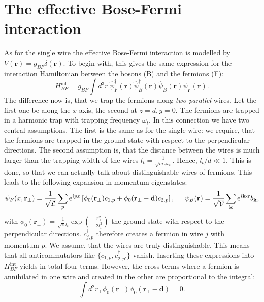 \section{The effective Bose-Fermi interaction} 
As for the single wire the effective Bose-Fermi interaction is modelled by $V(\mathbf{r}) = g_{BF}\delta(\mathbf{r})$. To begin with, this gives the same expression for the interaction Hamiltonian between the bosons (B) and the fermions (F):
\begin{equation}
H_{BF}^\text{int} = g_{BF}\int d^3 r \; \hat{\psi}_F^\dagger(\mathbf{r}) \hat{\psi}_B^\dagger(\mathbf{r})\hat{\psi}_B(\mathbf{r})\hat{\psi}_F(\mathbf{r}).
\end{equation}
The difference now is, that we trap the fermions along \textit{two parallel} wires. Let the first one be along the $x$-axis, the second at $z=d, y=0$. The fermions are trapped in a harmonic trap with trapping frequency $\omega_t$. In this connection we have two central assumptions. The first is the same as for the single wire: we require, that the fermions are trapped in the ground state with respect to the perpendicular directions. The second assumption is, that the distance between the wires is much larger than the trapping width of the wires $l_t = \frac{1}{\sqrt{m_F\omega_t}}$. Hence, $l_t/d \ll 1$. This is done, so that we can actually talk about distinguishable wires of fermions. This leads to the following expansion in momentum eigenstates:
\begin{equation}
\psi_F(x,\mathbf{r}_\perp) = \frac{1}{\sqrt{\mathcal{L}}}\sum_p \text{e}^{ipx} \left[\phi_0(\mathbf{r}_\perp) c_{1,p} + \phi_0(\mathbf{r}_\perp-\mathbf{d}) c_{2,p}\right], \hspace{0.5cm} \psi_B(\mathbf{r}) = \frac{1}{\sqrt{\mathcal{V}}}\sum_{\mathbf{k}} \text{e}^{i\mathbf{k}\cdot \mathbf{r}} b_\mathbf{k}, 
\end{equation}  
with $\phi_0(\mathbf{r}_\perp) = \frac{1}{\sqrt{\pi}l_t}\exp\left(-\frac{r_\perp^2}{2l_t^2}\right)$ the ground state with respect to the perpendicular directions. $c^\dagger_{j,p}$ therefore creates a fermion in wire $j$ with momentum $p$. We assume, that the wires are truly distinguishable. This means that all anticommutators like $\{c_{1,p}, c^\dagger_{2,p'}\}$ vanish. Inserting these expressions into $H_{BF}^\text{int}$ yields in total four terms. However, the cross terms where a fermion is annihilated in one wire and created in the other are proportional to the integral:
\begin{equation}
\int d^2 r_\perp \phi_0(\mathbf{r}_\perp)\phi_0(\mathbf{r}_\perp-\mathbf{d}) = 0. 
\end{equation}
